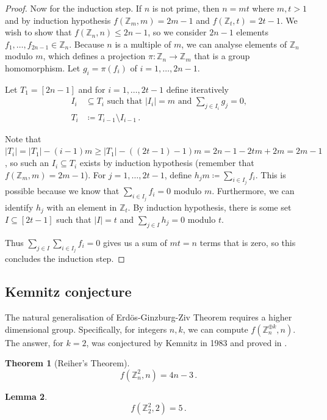 \documentclass[12pt]{amsart}
\theoremstyle{definition}
\newtheorem{thm}{Theorem}[section]
\newtheorem{lm}[thm]{Lemma}
\newcommand{\Z}{\mathbb{Z}}
\begin{document}
\begin{proof}
Now for the induction step.
If $n$ is not prime, then $n = mt$ where $m, t > 1$ and by induction hypothesis $f(\Z_m, m) = 2m - 1$ and $f(\Z_t, t) = 2t - 1$.
We wish to show that $f(\Z_n, n) \leq 2n-1$, so we consider $2n - 1$ elements $f_{1}, \ldots, f_{2n  - 1} \in \Z_n$.
Because $n$ is a multiple of $m$, we can analyse elements of $\Z_n$ modulo $m$, which defines a projection $\pi: \Z_n \to \Z_m$ that is a group homomorphism.
Let $g_i = \pi(f_i)$ of $i = 1, \ldots, 2n - 1$.

Let $T_1 = [2n-1]$ and for $i = 1, \ldots, 2t-1$ define iteratively
\begin{align*}
I_i &\subseteq T_i \text{ such that $|I_i| = m$ and $\sum_{j\in I_i} g_j = 0$,} \\
T_i &\coloneqq T_{i-1} \setminus I_{i-1} \, .
\end{align*}

Note that $|T_i| = |T_1| - (i-1)m \geq  |T_1| - ((2t-1) - 1)m = 2n - 1 - 2tm  + 2m = 2m - 1$, so such an $I_i \subseteq T_i $ exists by induction hypothesis (remember that $f(\Z_m, m) = 2m-1$).
For $j=1, \ldots, 2t-1$, define $h_j m \coloneqq  \sum_{i \in I_j} f_i$.
This is possible because we know that $ \sum_{i \in I_j} f_i = 0 $ modulo $m$.
Furthermore, we can identify $h_j $ with an element in $\Z_t$.
By induction hypothesis, there is some set $I \subseteq [2t-1]$ such that $|I| = t$ and $\sum_{j\in I} h_j = 0 $ modulo $t$.

Thus $\sum_{j\in I} \sum_{i \in I_j} f_i = 0$ gives us a sum of $mt = n$ terms that is zero, so this concludes the induction step.
\end{proof}

\subsection{Kemnitz conjecture}

The natural generalisation of Erd\"os-Ginzburg-Ziv Theorem requires a higher dimensional group.
Specifically, for integers $n, k$, we can compute $f(\Z_n^{\oplus k}, n)$.
The answer, for $k=2$, was conjectured by Kemnitz in 1983 and proved in \cite{reiher2007kemnitz}.


\begin{thm}[Reiher's Theorem]\label{thm:RT}
$$f(\Z_n^2, n ) = 4n - 3 \, . $$
\end{thm}

\begin{lm}
$$f(\Z_2^2, 2 ) = 5\, . $$
\end{lm}
\end{document}
